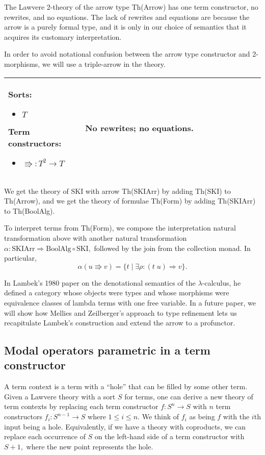 \documentclass{llncs}
\newcommand{\maps}{\colon}
\begin{document}
The Lawvere 2-theory of the arrow type Th(Arrow) has one term constructor, no rewrites, and no equations.  The lack of rewrites and equations are because the arrow is a purely formal type, and it is only in our choice of semantics that it acquires its customary interpretation.

In order to avoid notational confusion between the arrow type constructor and 2-morphisms, we will use a triple-arrow in the theory.
\begin{center}
  \begin{tabular}{|p{0.3\linewidth}|p{0.7\linewidth}|}
    \hline
    Sorts:
    \begin{itemize}
      \item $T$
    \end{itemize}
    Term constructors:
    \begin{itemize}
      \item $\Rrightarrow \maps T^2 \to T$
    \end{itemize}
    &
    No rewrites; no equations.\\
    \hline
  \end{tabular}
\end{center}

We get the theory of SKI with arrow Th(SKIArr) by adding Th(SKI) to Th(Arrow), and we get the theory of formulae Th(Form) by adding Th(SKIArr) to Th(BoolAlg).

To interpret terms from Th(Form), we compose the interpretation natural transformation above with another natural transformation $\alpha\maps \mathrm{SKIArr} \Rightarrow \mathrm{BoolAlg} \circ \mathrm{SKI},$ followed by the join from the collection monad.  In particular, 
\[ \alpha(u \Rrightarrow v) = \{ t \;|\; \exists \rho\maps (t\; u) \Rightarrow v \}. \]

In Lambek's 1980 paper \cite{Lambek} on the denotational semantics of the $\lambda$-calculus, he defined a category whose objects were types and whose morphisms were equivalence classes of lambda terms with one free variable.  In a future paper, we will show how Mellies and Zeilberger's approach to type refinement lets us recapitulate Lambek's construction and extend the arrow to a profunctor.

\subsection{Modal operators parametric in a term constructor}

A term context is a term with a ``hole'' that can be filled by some other term.  Given a Lawvere theory with a sort $S$ for terms, one can derive a new theory of term contexts by replacing each term constructor $f\maps S^n \to S$ with $n$ term constructors $f_i\maps S^{n-1} \to S$ where $1 \le i \le n$.  We think of $f_i$ as being $f$ with the $i$th input being a hole.  Equivalently, if we have a theory with coproducts, we can replace each occurrence of $S$ on the left-hand side of a term constructor with $S+1,$ where the new point represents the hole.
\end{document}
